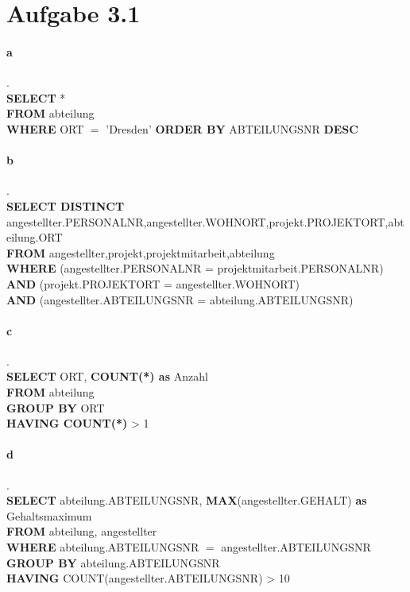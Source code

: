 \documentclass{article}
\begin{document}
	
	
	
	
	\section*{Aufgabe 3.1}
		\paragraph*{a}.\\
			\textbf{SELECT} *\\
			\textbf{FROM} abteilung\\
			\textbf{WHERE} ORT $=$ 'Dresden'
			\textbf{ORDER BY} ABTEILUNGSNR \textbf{DESC}
			
		\paragraph*{b}.\\
			\textbf{SELECT DISTINCT} angestellter.PERSONALNR,angestellter.WOHNORT,projekt.PROJEKTORT,abteilung.ORT\\
			\textbf{FROM} angestellter,projekt,projektmitarbeit,abteilung\\
			\textbf{WHERE} (angestellter.PERSONALNR = projektmitarbeit.PERSONALNR) \textbf{AND} (projekt.PROJEKTORT = angestellter.WOHNORT)\\ \textbf{AND} (angestellter.ABTEILUNGSNR = abteilung.ABTEILUNGSNR)
			
		\paragraph*{c}.\\
			\textbf{SELECT} ORT, \textbf{COUNT(*) as} Anzahl\\
			\textbf{FROM} abteilung\\
			\textbf{GROUP BY} ORT\\
			\textbf{HAVING COUNT(*)} > 1
			
		\paragraph*{d}.\\
			\textbf{SELECT} abteilung.ABTEILUNGSNR, \textbf{MAX}(angestellter.GEHALT) \textbf{as} Gehaltsmaximum\\
			\textbf{FROM} abteilung, angestellter\\
			\textbf{WHERE} abteilung.ABTEILUNGSNR $ = $ angestellter.ABTEILUNGSNR\\
			\textbf{GROUP BY} abteilung.ABTEILUNGSNR\\
			\textbf{HAVING} COUNT(angestellter.ABTEILUNGSNR) > 10
			
\end{document}
